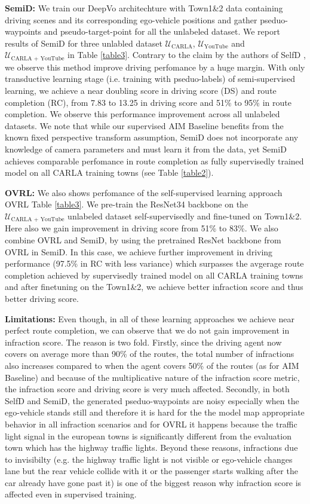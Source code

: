 \documentclass[letterpaper, 12pt]{book}
\theoremstyle{definition}
\theoremstyle{definition}
\theoremstyle{definition}
\theoremstyle{definition}
\theoremstyle{definition}
\begin{document}
\textbf{SemiD:} We train our DeepVo architechture with Town1\&2 data containing driving
scenes and its corresponding ego-vehicle positions and gather pseduo-waypoints
and pseudo-target-point for all the unlabeled dataset. We report results of
SemiD for three unlabled dataset \(\mathcal{U}_{\text{CARLA}}\), \(\mathcal{U}_{\text{YouTube}}\)
and \(\mathcal{U}_{\text{CARLA + YouTube}}\) in Table \ref{table3}. Contrary to the claim
by the authors of SelfD \cite{Zhang2022a}, we observe this method improve
driving perfomance by a huge margin. With only transductive learning stage
(i.e. training with pseduo-labels) of semi-supervised learning, we achieve a
near doubling score in driving score (DS) and route completion (RC), from 7.83
to 13.25 in driving score and 51\% to 95\% in route completion. We observe this
performance improvement across all unlabeled datasets. We note that while our
supervised AIM Baseline benefits from the known fixed perspective transform
assumption, SemiD does not incorporate any knowledge of camera parameters and
must learn it from the data, yet SemiD achieves comparable perfomance in route
completion as fully supervisedly trained model on all CARLA training towns (see
Table \ref{table2}).

\textbf{OVRL:} We also shows perfomance of the self-supervised learning approach OVRL
Table \ref{table3}. We pre-train the ResNet34 backbone on the \(\mathcal{U}_{\text{CARLA +
YouTube}}\) unlabeled dataset self-supervisedly and fine-tuned on Town1\&2. Here
also we gain improvement in driving score from 51\% to 83\%. We also combine OVRL
and SemiD, by using the pretrained ResNet backbone from OVRL in SemiD. In this
case, we achieve further improvement in driving performance (97.5\% in RC with
less variance) which surpasses the avgerage route completion achieved by
supervisedly trained model on all CARLA training towns and after finetuning on
the Town1\&2, we achieve better infraction score and thus better driving score.

\textbf{Limitations:} Even though, in all of these learning approaches we achieve near
perfect route completion, we can observe that we do not gain improvement in
infraction score. The reason is two fold. Firstly, since the driving agent now
covers on average more than 90\% of the routes, the total number of infractions
also increases compared to when the agent covers 50\% of the routes (as for AIM
Baseline) and because of the multiplicative nature of the infraction score
metric, the infraction score and driving score is very much affected. Secondly,
in both SelfD and SemiD, the generated pseduo-waypoints are noisy especially
when the ego-vehicle stands still and therefore it is hard for the the model map
appropriate behavior in all infraction scenarios and for OVRL it happens because
the traffic light signal in the european towns is significantly different from
the evaluation town which has the highway traffic lights. Beyond these reasons,
infractions due to invisibilty (e.g. the highway traffic light is not visible or
ego-vehicle changes lane but the rear vehicle collide with it or the passenger
starts walking after the car already have gone past it) is one of the biggest
reason why infraction score is affected even in supervised training.
\end{document}
